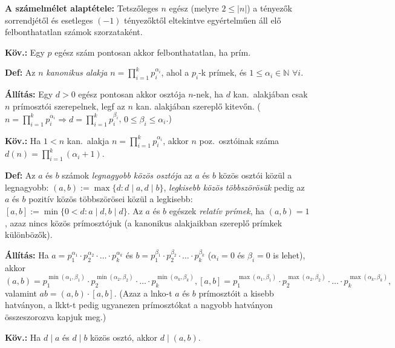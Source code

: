 \documentclass[a4paper, 12pt]{article}
\newcommand{\defi}{{\bf Def:} }
\newcommand{\kov}{{\bf Köv.:} }
\newcommand{\all}{{\bf Állítás:} }
\newcommand{\N}{{\mathbb N}}
\begin{document}
{\bf A számelmélet alaptétele:} Tetszőleges $n$ egész (melyre $2\le |n|$) a
tényezők sorrendjétől és esetleges $(-1)$ tényezőktől eltekintve
egyértelműen áll elő felbonthatatlan számok szorzataként.

\kov Egy $p$ egész szám pontosan akkor felbonthatatlan, ha prím.

\defi Az $n$ \emph{kanonikus alakja} $n=\prod_{i=1}^kp_i^{\alpha_i}$, ahol a
$p_i$-k prímek, és $1\le \alpha _i\in \N$  $\forall i$.

\all %
Egy $d>0$ egész
pontosan akkor osztója $n$-nek, ha $d$ kan.\ alakjában csak $n$
prímosztói szerepelnek, legf az $n$ kan. alakjában szereplő kitevőn.
($n=\prod_{i=1}^kp_i^{\alpha_i}\Rightarrow d=\prod_{i=1}^kp_i^{\beta_i}$,
$0\le \beta_i\le \alpha _i$.) 

\kov Ha $1<n$ kan.\ alakja $n=\prod_{i=1}^kp_i^{\alpha_i}$, akkor
$n$ poz.\ osztóinak száma $d(n)=\prod_{i=1}^k (\alpha_i+1)$.
\iffalse és $\sigma(n)=\prod_{i=1}^k\sum_{j=0}^{\alpha_i}
p_i^j=\prod_{i=1}^k\frac{p_i^{1+\alpha_i}-1}{p_i-1}$ az $n$ pozitív
osztóinak összege.
\fi



\defi Az $a$ és $b$ számok \emph{legnagyobb közös osztója} az $a$ és $b$
közös osztói közül a legnagyobb: $(a,b):=\max\{d:d\mid a, d\mid b\}$,
\emph{legkisebb közös többszörösük} pedig az $a$ és $b$ pozitív közös
többszörösei közül a legkisebb: $[a,b]:=\min\{0<d:a\mid d, b\mid d\}$. Az
$a$ és $b$ egészek \emph{relatív prímek}, ha $(a,b)=1$, azaz nincs közös
prímosztójuk (a kanonikus alakjaikban szereplő prímkek különbözők).

\all Ha $a=p_1^{\alpha_1}\cdot p_2^{\alpha_2}\cdot\ldots\cdot
p_k^{\alpha_k}$ és $b=p_1^{\beta_1}\cdot p_2^{\beta_2}\cdot\ldots\cdot
p_k^{\beta_k}$ ($\alpha_i=0$ és $\beta_i=0$ is lehet), akkor\\
$(a,b)= p_1^{\min(\alpha_1, \beta_1)}\cdot p_2^{\min(\alpha_2,
  \beta_2)}\cdot\ldots\cdot p_k^{\min(\alpha_k, \beta_k)}, 
[a,b]= p_1^{\max(\alpha_1, \beta_1)}\cdot p_2^{\max(\alpha_2,
  \beta_2)}\cdot\ldots\cdot p_k^{\max(\alpha_k, \beta_k)},$\\
valamint $ab=(a,b)\cdot [a,b]$. (Azaz a lnko-t $a$ és $b$ prímosztóit a
kisebb hatványon, a lkkt-t pedig ugyanezen prímosztókat a nagyobb hatványon
összeszorozva kapjuk meg.)

\kov Ha $d\mid a$ és $d\mid b$ közös osztó, akkor $d\mid (a,b)$.
\end{document}

